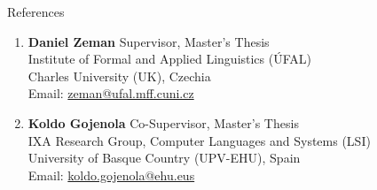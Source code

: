 \documentclass{resume}
\begin{document}
\begin{rSection}{References}

    \begin{enumerate}
        \item \textbf{Daniel Zeman} \hfill Supervisor, Master's Thesis\\
            Institute of Formal and Applied Linguistics ({\'U}FAL)\\
            Charles University (UK), Czechia\\
            Email: \href{mailto:zeman@ufal.mff.cuni.cz}{zeman@ufal.mff.cuni.cz}
        
        \item \textbf{Koldo Gojenola} \hfill Co-Supervisor, Master's Thesis\\
            IXA Research Group, Computer Languages and Systems (LSI)\\
            University of Basque Country (UPV-EHU), Spain\\
            Email: \href{mailto:koldo.gojenola@ehu.eus}{koldo.gojenola@ehu.eus}
    \end{enumerate}

\end{rSection}
\end{document}

